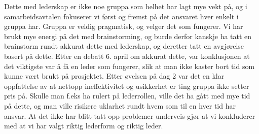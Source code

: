 Dette med lederskap er ikke noe gruppa som helhet har lagt mye vekt på, og i
samarbeidsavtalen fokuserer vi først og fremst på det ansvaret hver enkelt i
gruppa har.  Gruppa er veldig pragmatisk, og velger det som fungerer. Vi har
brukt mye energi på det med brainstorming, og burde derfor kanskje ha tatt en
brainstorm rundt akkurat dette med lederskap, og deretter tatt en avgjørelse
basert på dette.  Etter en debatt 6. april om akkurat dette, var konklusjonen
at det viktigste var å få en leder som fungerer, slik at man ikke kaster bort
tid som kunne vært brukt på prosjektet. Etter øvelsen på dag 2 var det en klar
oppfattelse av at nettopp ineffektivitet og usikkerhet er ting gruppa ikke setter
pris på. Skulle man f.eks ha rulert på lederrollen, ville det ha gått med mye
tid på dette, og man ville risikere uklarhet rundt hvem som til en hver tid har
ansvar. At det ikke har blitt tatt opp problemer underveis gjør at vi
konkluderer med at vi har valgt riktig lederform og riktig leder. 
